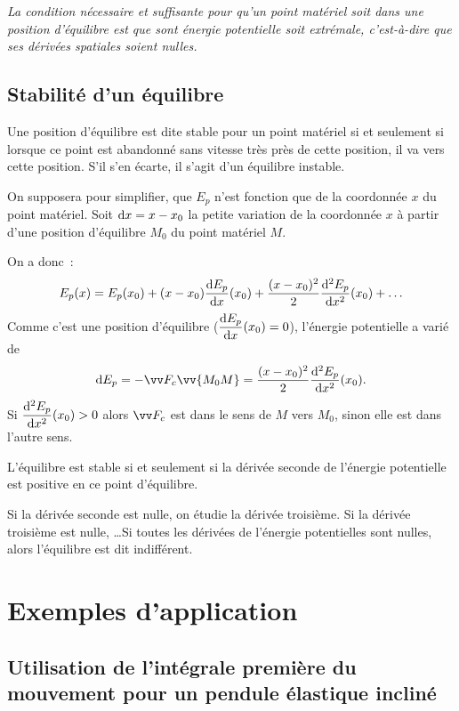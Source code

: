 \emph{La condition nécessaire et suffisante pour qu'un point matériel soit dans une position d'équilibre est que sont énergie potentielle soit extrémale, c'est-à-dire que ses dérivées spatiales soient nulles.}

\subsection{Stabilité d'un équilibre}
\label{chap4-subsec:stabiliteequilibre}

\begin{defdef}
  Une position d'équilibre est dite stable pour un point matériel si et seulement si lorsque ce point est abandonné sans vitesse très près de cette position, il va vers cette position. S'il s'en écarte, il s'agit d'un équilibre instable.
\end{defdef}

On supposera pour simplifier, que $E_p$ n'est fonction que de la coordonnée $x$ du point matériel. Soit $\mathrm{d} x = x-x_0$ la petite variation de la coordonnée $x$ à partir d'une position d'équilibre $M_0$ du point matériel $M$. 

On a donc~:
\begin{equation}
  E_p(x) = E_p(x_0) +(x-x_0)\dfrac{\mathrm{d} E_p}{\mathrm{d} x}(x_0) +\frac{(x-x_0)^2}{2}\dfrac{\mathrm{d}^2 E_p}{\mathrm{d} {x}^2}(x_0) + \ldots
\end{equation}
Comme c'est une position d'équilibre ($\dfrac{\mathrm{d} E_p}{\mathrm{d} x}(x_0)=0$), l'énergie potentielle a varié de
\begin{equation}
  \D E_p = -\vF_c \vv{M_0M} = \frac{(x-x_0)^2}{2}\deriveds{E_p}{x}(x_0).
\end{equation}
Si $\dfrac{\mathrm{d}^2 E_p}{\mathrm{d} {x}^2}(x_0)>0$ alors $\vF_c$ est dans le sens de $M$ vers $M_0$, sinon elle est dans l'autre sens.

L'équilibre est stable si et seulement si la dérivée seconde de l'énergie potentielle est positive en ce point d'équilibre.

Si la dérivée seconde est nulle, on étudie la dérivée troisième. Si la dérivée troisième est nulle, \ldots Si toutes les dérivées de l'énergie potentielles sont nulles, alors l'équilibre est dit indifférent.

\section{Exemples d'application}
\label{chap4-sec:exemplesdapplication}

\subsection{Utilisation de l'intégrale première du mouvement pour un pendule élastique incliné}
\label{chap4-subsec:penduleelastique}

